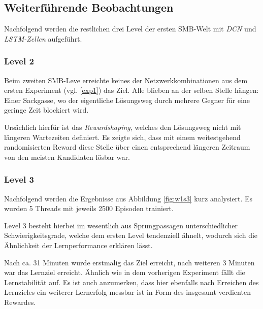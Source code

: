 \documentclass[sigconf,nonacm]{acmart}
\begin{document}
\subsection{Weiterführende Beobachtungen}

Nachfolgend werden die restlichen drei Level der ersten SMB-Welt mit \textit{DCN} und \textit{LSTM-Zellen} aufgeführt.

\subsubsection{Level 2}\hfill \break

Beim zweiten SMB-Leve erreichte keines der Netzwerkkombinationen aus dem ersten Experiment (vgl. \ref{exp1}) das Ziel. Alle blieben an der selben Stelle hängen: Einer Sackgasse, wo der eigentliche Lösungsweg durch mehrere Gegner für eine geringe Zeit blockiert wird.

Ursächlich hierfür ist das \textit{Rewardshaping}, welches den Lösungsweg nicht mit längeren Wartezeiten definiert. Es zeigte sich, dass mit einem weitestgehend randomisierten Reward diese Stelle über einen entsprechend längeren Zeitraum von den meisten Kandidaten lösbar war.

\subsubsection{Level 3}\hfill \break

Nachfolgend werden die Ergebnisse aus Abbildung \ref{fig:w1s3} kurz analysiert. Es wurden 5 Threads mit jeweils 2500 Episoden trainiert.

Level 3 besteht hierbei im wesentlich aus Sprungpassagen unterschiedlicher Schwierigkeitsgrade, welche dem ersten Level tendenziell ähnelt, wodurch sich die Ähnlichkeit der Lernperformance erklären lässt.

Nach ca. 31 Minuten wurde erstmalig das Ziel erreicht, nach weiteren 3 Minuten war das Lernziel erreicht. Ähnlich wie in dem vorherigen Experiment fällt die Lernstabilität auf. Es ist auch anzumerken, dass hier ebenfalls nach Erreichen des Lernzieles ein weiterer Lernerfolg messbar ist in Form des insgesamt verdienten Rewardes.
\end{document}
